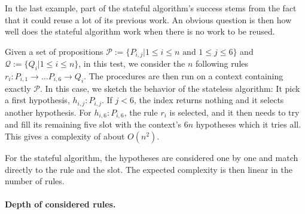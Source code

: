 \documentclass[runningheads]{llncs}
\begin{document}
In the last example, part of the stateful algorithm's success stems from the fact that it could reuse a lot of its previous work.
An obvious question is then how well does the stateful algorithm work when there is no work to be reused.

Given a set of propositions $\mathcal{P} := \{P_{i,j} | 1 \leq i \leq n \text{ and } 1 \leq j \leq 6\}$ and $\mathcal{Q} :=\{Q_{i} | 1 \leq i \leq n \}$, in this test, we consider the $n$ following rules $r_i : P_{i,1}\to \dots P_{i,6} \to Q_i$.
The procedures are then run on a context containing exactly $\mathcal{P}$.
In this case, we sketch the behavior of the stateless algorithm:
It pick a first hypothesis, $h_{i,j} : P_{i,j}$.
If $j < 6$, the index returns nothing and it selects another hypothesis.
For $h_{i,6} : P_{i,6}$, the rule $r_i$ is selected, and it then needs to try and fill its remaining five slot with the context's $6n$ hypotheses which it tries all.
This gives a complexity of about $O(n^2)$.

For the stateful algorithm, the hypotheses are considered one by one and match directly to the rule and the slot.
The expected complexity is then linear in the number of rules.

\paragraph{Depth of considered rules.}

\begin{figure}
    \label{fig:erase}
    \end{figure}
\end{document}
